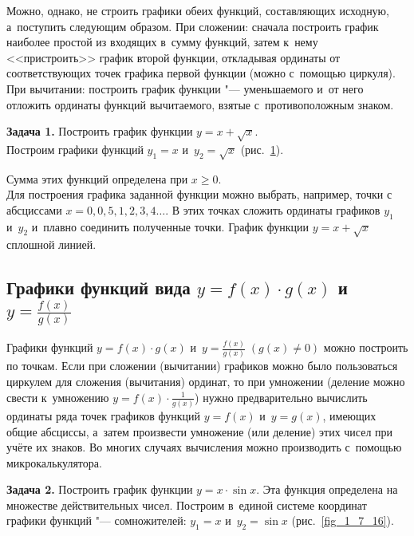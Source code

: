 \begin{figure*}
\end{figure*}

Можно, однако, не строить графики обеих функций, составляющих исходную,
а~поступить следующим образом.
При сложении: сначала построить график наиболее простой из входящих
в~сумму функций, затем к~нему <<пристроить>> график второй функции,
откладывая ординаты от соответствующих точек графика первой функции
(можно с~помощью циркуля).
При вычитании: построить график функции "--- уменьшаемого и~от него
отложить ординаты функций вычитаемого, взятые с~противоположным знаком.

\textbf{Задача 1.} Построить график функции $y = x + \sqrt{x}$. \\
Построим графики функций $y_{1} = x$ и~$y_{2} = \sqrt{x}$ (рис.\ \ref{fig_1_7_15}).

\begin{figure}\label{fig_1_7_15}
\end{figure}

Сумма этих функций определена при $x \geqslant 0$. \\
Для построения графика заданной функции можно выбрать, например,
точки с абсциссами $x = 0, 0{,}5, 1, 2, 3, 4 \dots$.
В этих точках сложить ординаты графиков $y_{1}$ и~$y_{2}$ и~плавно
соединить полученные точки. График функции $y = x + \sqrt{x}$
сплошной линией.


\subsection{Графики функций вида $y = f(x) \cdot g(x)$
и~$\displaystyle y = \frac{f(x)}{g(x)}$}

Графики функций  $y = f(x) \cdot g(x)$
и~$\displaystyle y = \frac{f(x)}{g(x)} \; (g(x) \ne 0)$ можно
построить по точкам. Если при сложении (вычитании) графиков
можно было пользоваться циркулем для сложения (вычитания) ординат,
то при умножении (деление можно свести к~умножению 
$\displaystyle y = f(x) \cdot \frac{1}{g(x)}$)
нужно предварительно вычислить ординаты ряда точек графиков
функций $y = f(x)$ и~$y = g(x)$, имеющих общие абсциссы, а~затем
произвести умножение (или деление) этих чисел при учёте их знаков.
Во многих случаях вычисления можно производить с~помощью микрокалькулятора.

\textbf{Задача 2.} Построить график функции $y = x \cdot \sin x$.
Эта функция определена на множестве действительных чисел. Построим
в~единой системе координат графики функций "--- сомножителей:
$y_{1} = x$ и~$y_{2} = \sin x$ (рис.\ \ref{fig_1_7_16}).

